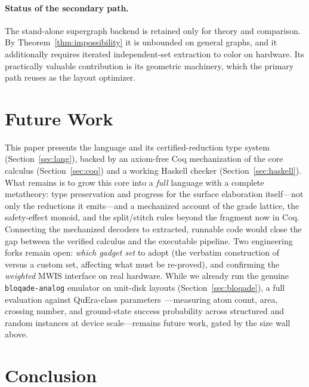 \documentclass[11pt]{article}
\theoremstyle{definition}
\theoremstyle{remark}
\begin{document}
\paragraph{Status of the secondary path.} The stand-alone supergraph backend is
retained only for theory and comparison. By Theorem~\ref{thm:impossibility} it is
unbounded on general graphs, and it additionally requires iterated independent-set
extraction to color on hardware. Its practically valuable contribution is its
geometric machinery, which the primary path reuses as the layout optimizer.

\section{Future Work}
\label{sec:future}

This paper presents the language and its certified-reduction type system
(Section~\ref{sec:lang}), backed by an axiom-free Coq mechanization of the core
calculus (Section~\ref{sec:coq}) and a working Haskell checker
(Section~\ref{sec:haskell}). What remains is to grow this core into a \emph{full}
language with a complete metatheory: type preservation and progress for the surface
elaboration itself---not only the reductions it emits---and a mechanized account of
the grade lattice, the safety-effect monoid, and the split/stitch rules beyond the
fragment now in Coq. Connecting the mechanized decoders to extracted, runnable code
would close the gap between the verified calculus and the executable pipeline. Two engineering forks remain open: \emph{which gadget
set} to adopt (the verbatim construction of~\cite{Nguyen2023} versus a custom set,
affecting what must be re-proved), and confirming the \emph{weighted} MWIS interface
on real hardware. While we already run the genuine \texttt{bloqade-analog} emulator
on unit-disk layouts (Section~\ref{sec:bloqade}), a full evaluation against
QuEra-class parameters~\cite{Wurtz2023}---measuring atom count, area, crossing
number, and ground-state success probability across structured and random instances
at device scale---remains future work, gated by the size wall above.

\section{Conclusion}
\label{sec:conclusion}
\end{document}
